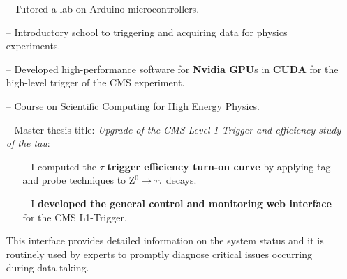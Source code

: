 \documentclass[10pt,a4paper]{altacv}
\begin{document}
\begin{itemize}
    \setlength{\itemindent}{0.5em}
    \item[--]   \small{Tutored a lab on Arduino microcontrollers.}
\end{itemize}

\medskip


\begin{itemize}
    \setlength{\itemindent}{0.5em}
    \item[--]   \small{Introductory school to triggering and acquiring data for physics experiments.}
\end{itemize}

\medskip


\begin{itemize}
    \setlength{\itemindent}{0.5em}
    \item[--]   \small{Developed high-performance software for \textbf{Nvidia GPU}s in \textbf{CUDA} for the high-level trigger of the CMS experiment.}
\end{itemize}

\medskip


\begin{itemize}
    \setlength{\itemindent}{0.5em}
    \item[--]   \small{Course on Scientific Computing for High Energy Physics.}
\end{itemize}

\medskip


\begin{itemize}
    \setlength{\itemindent}{0.5em}
    \item[--]   \small{Master thesis title: \textit{Upgrade of the CMS Level-1 Trigger and efficiency study of the tau}}:
    \begin{itemize}
    \item[--]   \small{I computed the $\tau$ \textbf{trigger efficiency turn-on curve} by applying tag and probe techniques to Z$^0\to\tau\tau$ decays. }
    \item[--]   \small{I \textbf{developed the general control and monitoring web interface} for the CMS L1-Trigger. }
    \end{itemize}
    This interface provides detailed information on the system status and it is routinely used by experts to promptly diagnose critical issues occurring during data taking.
\end{itemize}
\end{document}
